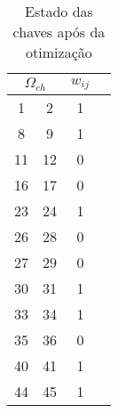 \begin{table}[H]
    \centering
    \caption{Estado das chaves após da otimização}
    \label{tab:est_chave_otim}
    \begin{tabular}{|c|c|c|c|}
        \hline
        \multicolumn{2}{|c|}{$\Omega_{ch}$} & $w_{ij}$\\ \hline
         1 &   2    & 1\\ \hline
         8 &   9    & 1\\ \hline
        11 &  12    & 0\\ \hline
        16 &  17    & 0\\ \hline
        23 &  24    & 1\\ \hline
        26 &  28    & 0\\ \hline
        27 &  29    & 0\\ \hline
        30 &  31    & 1\\ \hline
        33 &  34    & 1\\ \hline
        35 &  36    & 0\\ \hline
        40 &  41    & 1\\ \hline
        44 &  45    & 1\\ \hline
    \end{tabular}
\end{table}